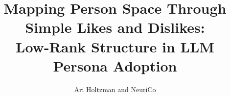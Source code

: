 \documentclass{article}
\title{Mapping Person Space Through Simple Likes and Dislikes: \\
Low-Rank Structure in LLM Persona Adoption}
\author{Ari Holtzman and NeuriCo}
\begin{document}
\maketitle

\begin{abstract}

\end{abstract}










\end{document}
